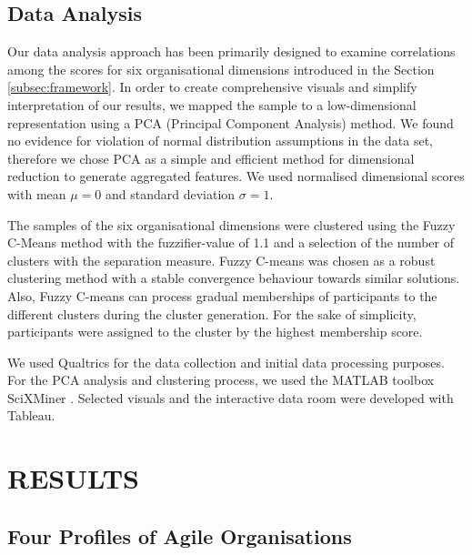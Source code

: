 \documentclass{article}
\newcommand{\myremark}[1]{{#1}}
\newcommand{\rmremark}[1]{\myremark{\color{red} [Ralf: #1]}}
\newcommand{\ikremark}[1]{\myremark{\color{blue} [Ivan: #1]}}
\begin{document}
\subsection{Data Analysis}


Our data analysis approach has been primarily designed to examine correlations among the scores for six organisational dimensions introduced in the Section \ref{subsec:framework}. In order to create comprehensive visuals and simplify interpretation of our results, we mapped the sample to a low-dimensional representation using a PCA (Principal Component Analysis) method. We found no evidence for violation of normal distribution assumptions in the data set, therefore we chose PCA as a simple and efficient method for dimensional reduction to generate aggregated features. We used normalised dimensional scores with mean $\mu = 0$ and standard deviation $\sigma = 1$.

The samples of the six organisational dimensions were clustered using the Fuzzy C-Means method \cite{Bezdek81} with the fuzzifier-value of 1.1 and a selection of the number of clusters with the separation measure. Fuzzy C-means was chosen as a robust clustering method with a stable convergence behaviour towards similar solutions. Also, Fuzzy C-means can process gradual memberships of participants to the different clusters during the cluster generation. For the sake of simplicity, participants were assigned to the cluster by the highest membership score.



We used Qualtrics for the data collection and initial data processing purposes. For the PCA analysis and clustering process, we used the MATLAB toolbox SciXMiner \cite{Mikut17}. Selected visuals and the interactive data room were developed with  Tableau.


\section{RESULTS}
\label{sec:results}

\subsection{Four Profiles of Agile Organisations}
\label{subsec:four-profiles}
\end{document}
